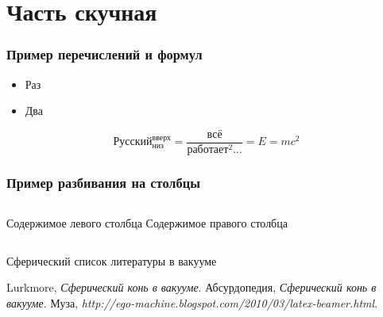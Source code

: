 \documentclass[ignorenonframetext,hyperref={pdftex,unicode}]{beamer}
\begin{document}
\section{Часть скучная}
\begin{frame}\frametitle{Пример перечислений и формул} 
	\begin{itemize}
		\item Раз
		\item Два
	\end{itemize}
	\begin{equation}
    	Русский_{низ}^{вверх} = \frac{всё}{работает^2\dots} = E = m c^2
	\end{equation}
\end{frame}

\begin{frame}\frametitle{Пример разбивания на столбцы}
 	\begin{columns}
 			Содержимое левого столбца
 			Содержимое правого столбца
 	\end{columns}
\end{frame}


\begin{frame}{Сферический список литературы в вакууме}
	\begin{thebibliography}{10}
	\beamertemplatebookbibitems
		{\sc Lurkmore}, {\em Сферический конь в вакууме}.
		{\sc Абсурдопедия}, {\em Сферический конь в вакууме}.
		{\sc Муза}, {\em http://ego-machine.blogspot.com/2010/03/latex-beamer.html}.
	\end{thebibliography}
\end{frame}
\end{document}
